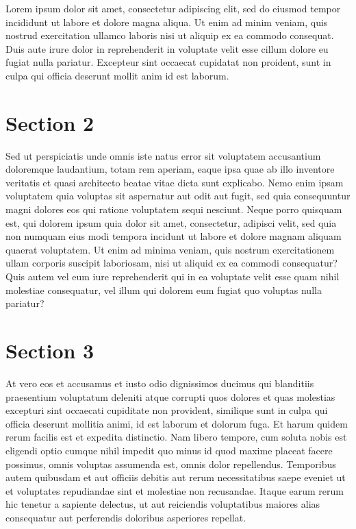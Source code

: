 \documentclass[
]{book}
\begin{document}
Lorem ipsum dolor sit amet, consectetur adipiscing elit, sed do eiusmod tempor incididunt ut labore et dolore magna aliqua. Ut enim ad minim veniam, quis nostrud exercitation ullamco laboris nisi ut aliquip ex ea commodo consequat. Duis aute irure dolor in reprehenderit in voluptate velit esse cillum dolore eu fugiat nulla pariatur. Excepteur sint occaecat cupidatat non proident, sunt in culpa qui officia deserunt mollit anim id est laborum.

\hypertarget{section-2-8}{%
\section{Section 2}\label{section-2-8}}

Sed ut perspiciatis unde omnis iste natus error sit voluptatem accusantium doloremque laudantium, totam rem aperiam, eaque ipsa quae ab illo inventore veritatis et quasi architecto beatae vitae dicta sunt explicabo. Nemo enim ipsam voluptatem quia voluptas sit aspernatur aut odit aut fugit, sed quia consequuntur magni dolores eos qui ratione voluptatem sequi nesciunt. Neque porro quisquam est, qui dolorem ipsum quia dolor sit amet, consectetur, adipisci velit, sed quia non numquam eius modi tempora incidunt ut labore et dolore magnam aliquam quaerat voluptatem. Ut enim ad minima veniam, quis nostrum exercitationem ullam corporis suscipit laboriosam, nisi ut aliquid ex ea commodi consequatur? Quis autem vel eum iure reprehenderit qui in ea voluptate velit esse quam nihil molestiae consequatur, vel illum qui dolorem eum fugiat quo voluptas nulla pariatur?

\hypertarget{section-3-8}{%
\section{Section 3}\label{section-3-8}}

At vero eos et accusamus et iusto odio dignissimos ducimus qui blanditiis praesentium voluptatum deleniti atque corrupti quos dolores et quas molestias excepturi sint occaecati cupiditate non provident, similique sunt in culpa qui officia deserunt mollitia animi, id est laborum et dolorum fuga. Et harum quidem rerum facilis est et expedita distinctio. Nam libero tempore, cum soluta nobis est eligendi optio cumque nihil impedit quo minus id quod maxime placeat facere possimus, omnis voluptas assumenda est, omnis dolor repellendus. Temporibus autem quibusdam et aut officiis debitis aut rerum necessitatibus saepe eveniet ut et voluptates repudiandae sint et molestiae non recusandae. Itaque earum rerum hic tenetur a sapiente delectus, ut aut reiciendis voluptatibus maiores alias consequatur aut perferendis doloribus asperiores repellat.
\end{document}
